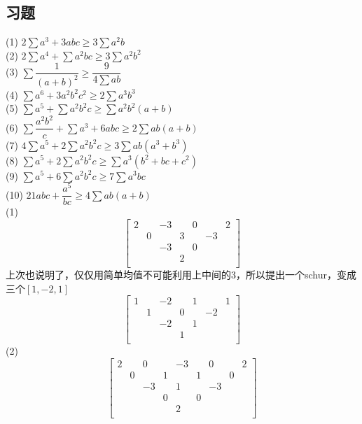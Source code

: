 \documentclass[UTF8]{ctexart}
\begin{document}
\subsection{习题}
\noindent (1) $2 \displaystyle  \sum a^{3}+3 a b c \geq 3\displaystyle  \sum  a^{2} b$\\
(2) $2\displaystyle  \sum  a^{4}+\displaystyle  \sum  a^{2} b c \geq 3 \sum a^{2} b^{2}$\\
(3) $ \displaystyle  \sum \dfrac{1}{(a+b)^{2}} \geq \dfrac{9}{4 \displaystyle  \sum a b}$\\
(4) $\displaystyle  \sum  a^{6}+3 a^{2} b^{2} c^{2} \geq 2 \displaystyle  \sum  a^{3} b^{3}$\\
(5) $\displaystyle  \sum a^{5}+\displaystyle  \sum  a^{2} b^{2} c \geq \displaystyle  \sum a^{2} b^{2}(a+b)$\\
(6) $ \displaystyle  \sum  \dfrac{a^{2} b^{2}}{c}+\displaystyle  \sum  a^{3}+6 a b c \geq 2 \displaystyle  \sum  a b(a+b)$\\
(7) $4 \displaystyle  \sum a^{5}+2\sum a^{2} b^{2} c \geq 3 \displaystyle  \sum  a b\left(a^{3}+b^{3}\right)$\\
(8) $\displaystyle  \sum  a^{5}+2  \displaystyle  \sum  a^{2} b^{2} c \geq \displaystyle  \sum  a^{3}\left(b^{2}+b c+c^{2}\right)$\\
(9) $\displaystyle  \sum a^{5}+6  \displaystyle  \sum a^{2} b^{2} c \geq 7 \displaystyle  \sum  a^{3} b c$\\
(10) $21 a b c+\dfrac{a^{5}}{b c} \geq 4\displaystyle  \sum  a b(a+b)$\\
\noindent (1)  \renewcommand*{\arraystretch}{1.732}\[\left[\begin{matrix}
	2& &-3& &0& &2\\
	&0& &3& &-3&\\
	& &-3& &0& & \\
	& & &2& & &\\
\end{matrix}\right]\] 
上次也说明了，仅仅用简单均值不可能利用上中间的3，所以提出一个schur，变成三个$ [1,-2,1] $
 \renewcommand*{\arraystretch}{1.732}\[\left[\begin{matrix}
	1& &-2& &1& &1\\
	&1& &0& &-2&\\
	& &-2& &1& & \\
	& & &1& & &\\
\end{matrix}\right]\]
(2)\renewcommand*{\arraystretch}{1.732}\[\left[\begin{matrix}
	2& &0& &-3& &0& &2\\
	&0& &1& &1& &0&\\
	& &-3& &1& &-3& &\\
	& & &0& &0& & &\\
	& & & &2& & & &\\
\end{matrix}\right]\]
\end{document}
